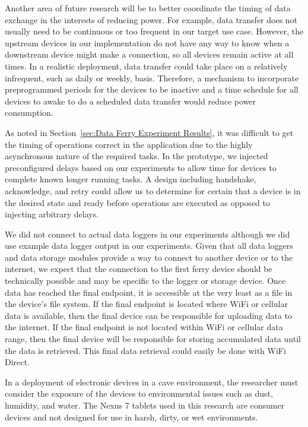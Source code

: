 \documentclass[10pt,twocolumn]{article}
\begin{document}
Another area of future research will be to better coordinate the timing of data exchange in the interests of reducing power.
For example, data transfer does not usually need to be continuous or too frequent in our target use case.
However, the upstream devices in our implementation do not have any way to know when a downstream device might make a connection, so all devices remain active at all times.
In a realistic deployment, data transfer could take place on a relatively infrequent, such as daily or weekly, basis.
Therefore, a mechanism to incorporate preprogrammed periods for the devices to be inactive
and a time schedule for all devices to awake to do a scheduled data transfer would reduce power consumption.

As noted in Section~\ref{sec:Data Ferry Experiment Results}, it was difficult to get the timing of operations correct in the application due to the highly asynchronous nature of the required tasks.
In the prototype, we injected preconfigured delays based on our experiments to allow time for devices to complete known longer running tasks.
A design including handshake, acknowledge, and retry could allow us to determine for certain that a device is in the desired state and ready before operations are executed as opposed to injecting arbitrary delays.

We did not connect to actual data loggers in our experiments although we did use example data logger output in our experiments.
Given that all data loggers and data storage modules provide a way to connect to another device or to the internet, 
we expect that the connection to the first ferry device should be technically possible and may be specific to the logger or storage device.
Once data has reached the final endpoint, it is accessible at the very least as a file in the device's file system.
If the final endpoint is located where WiFi or cellular data is available, then the final device can be responsible for uploading data to the internet.
If the final endpoint is not located within WiFi or cellular data range, then the final device will be responsible for storing accumulated data until the data is retrieved.
This final data retrieval could easily be done with WiFi Direct.

In a deployment of electronic devices in a cave environment, the researcher must consider the exposure of the devices to environmental issues such as dust, humidity, and water.
The Nexus 7 tablets used in this research are consumer devices and not designed for use in harsh, dirty, or wet environments.
\end{document}
